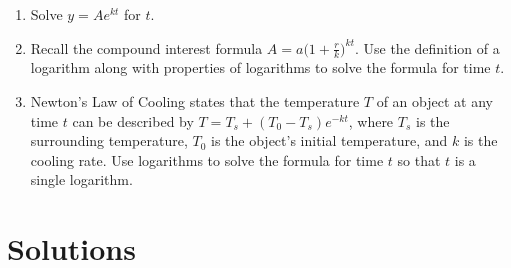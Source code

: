 \documentclass{article}
\begin{document}
\begin{enumerate}[label=\textbf{\arabic*.}, leftmargin=*, itemsep=0.6em]
\item Solve  \(y=Ae^{kt}\) for $t$.

\item Recall the compound interest formula \(A=a\big(1+\tfrac{r}{k}\big)^{kt}\). Use the definition of a logarithm along with properties of logarithms to solve the formula for time \(t\).

\item Newton’s Law of Cooling states that the temperature \(T\) of an object at any time \(t\) can be described by
\(T=T_s+(T_0-T_s)e^{-kt}\),
where \(T_s\) is the surrounding temperature, \(T_0\) is the object’s initial temperature, and \(k\) is the cooling rate. Use logarithms to solve the formula for time \(t\) so that \(t\) is a single logarithm.

\end{enumerate}

\newpage
\section*{Solutions}
\end{document}
